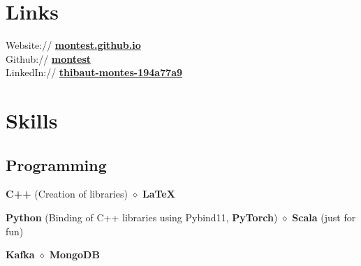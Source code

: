 \documentclass[]{deedy-resume-openfont}
\begin{document}
%
%
\lastupdated

%
%

%
%

\begin{minipage}[t]{0.33\textwidth}


	\vspace{\topsep}
	\vspace{\topsep}
	\section{Links}
	Website:// \href{https://montest.github.io}{\bf montest.github.io} \\
	Github:// \href{https://github.com/montest}{\bf montest} \\
	LinkedIn:// \href{https://www.linkedin.com/in/thibaut-montes-194a77a9}{\bf thibaut-montes-194a77a9}


	\vspace{\topsep}
	\vspace{\topsep}
	\section{Skills}

	\subsection{Programming}
	\vspace{\topsep}
	\begin{tightemize}
		\item {}
		\textbf{C++} (Creation of libraries) $\diamond$ \textbf{\LaTeX} \\
		\item {}
		\textbf{Python} (Binding of C++ libraries using Pybind11, \textbf{PyTorch}) $\diamond$ \textbf{Scala} (just for fun) \\
		\item {}
		\textbf{Kafka} $\diamond$ \textbf{MongoDB}
	\end{tightemize}


\end{minipage}
\end{document}
